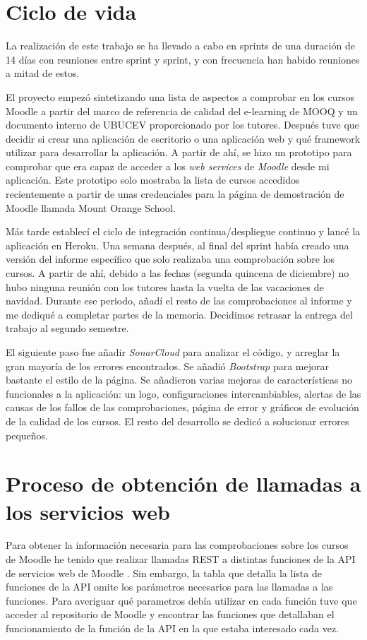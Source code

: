\section{Ciclo de vida}
La realización de este trabajo se ha llevado a cabo en sprints de una duración de 14 días con reuniones entre sprint y sprint, y con frecuencia han habido reuniones a mitad de estos.

El proyecto empezó sintetizando una lista de aspectos a comprobar en los cursos Moodle a partir del marco de referencia de calidad del e-learning de MOOQ \cite{stracke2018quality} y un documento interno de UBUCEV proporcionado por los tutores.
Después tuve que decidir si crear una aplicación de escritorio o una aplicación web y qué framework utilizar para desarrollar la aplicación.
A partir de ahí, se hizo un prototipo para comprobar que era capaz de acceder a los \textit{web services} de \textit{Moodle} desde mi aplicación. Este prototipo solo mostraba la lista de cursos accedidos recientemente a partir de unas credenciales para la página de demostración de Moodle llamada Mount Orange School.

Más tarde establecí el ciclo de integración continua/despliegue continuo y lancé la aplicación en Heroku. Una semana después, al final del sprint había creado una versión del informe específico que solo realizaba una comprobación sobre los cursos. A partir de ahí, debido a las fechas (segunda quincena de diciembre) no hubo ninguna reunión con los tutores hasta la vuelta de las vacaciones de navidad. Durante ese periodo, añadí el resto de las comprobaciones al informe y me dediqué a completar partes de la memoria. Decidimos retrasar la entrega del trabajo al segundo semestre.

El siguiente paso fue añadir \textit{SonarCloud} para analizar el código, y arreglar la gran mayoría de los errores encontrados. Se añadió \textit{Bootstrap} para mejorar bastante el estilo de la página. Se añadieron varias mejoras de características no funcionales a la aplicación: un logo, configuraciones intercambiables, alertas de las causas de los fallos de las comprobaciones, página de error y gráficos de evolución de la calidad de los cursos. El resto del desarrollo se dedicó a solucionar errores pequeños.

\section{Proceso de obtención de llamadas a los servicios web}
Para obtener la información necesaria para las comprobaciones sobre los cursos de Moodle he tenido que realizar llamadas REST a distintas funciones de la API de servicios web de Moodle \cite{wsapifunctions-2021}. Sin embargo, la tabla que detalla la lista de funciones de la API omite los parámetros necesarios para las llamadas a las funciones.
Para averiguar qué parametros debía utilizar en cada función tuve que acceder al repositorio de Moodle \cite{moodlerepository-2022} y encontrar las funciones que detallaban el funcionamiento de la función de la API en la que estaba interesado cada vez.

